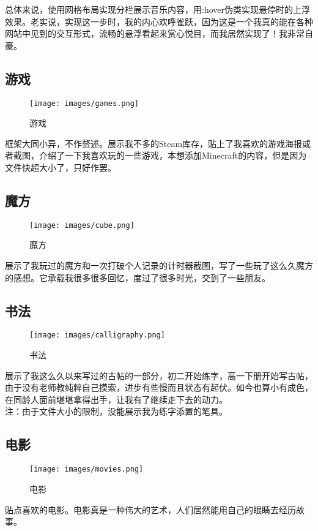 \documentclass[supercite]{Experimental_Report}
\theoremstyle{definition}
\begin{document}
	总体来说，使用网格布局实现分栏展示音乐内容，用:hover伪类实现悬停时的上浮效果。老实说，实现这一步时，我的内心欢呼雀跃，因为这是一个我真的能在各种网站中见到的交互形式，流畅的悬浮看起来赏心悦目，而我居然实现了！我非常自豪。
	
\subsection{游戏}

\begin{figure}[h]
	\begin{center}
		\texttt{[image: images/games.png]}
		\caption{游戏}
		\label{fig3-3}
	\end{center}
\end{figure}
框架大同小异，不作赘述。展示我不多的Steam库存，贴上了我喜欢的游戏海报或者截图，介绍了一下我喜欢玩的一些游戏，本想添加Minecraft的内容，但是因为文件快超大小了，只好作罢。
\subsection{魔方}
\begin{figure}[h]
	\begin{center}
		\texttt{[image: images/cube.png]}
		\caption{魔方}
		\label{fig3-4}
	\end{center}
\end{figure}
展示了我玩过的魔方和一次打破个人记录的计时器截图，写了一些玩了这么久魔方的感想。它承载我很多很多回忆，度过了很多时光，交到了一些朋友。
\newpage
\subsection{书法}
\begin{figure}[h]
	\begin{center}
		\texttt{[image: images/calligraphy.png]}
		\caption{书法}
		\label{fig3-5}
	\end{center}
\end{figure}
展示了我这么久以来写过的古帖的一部分，初二开始练字，高一下册开始写古帖，由于没有老师教纯粹自己摸索，进步有些慢而且状态有起伏。如今也算小有成色，在同龄人面前堪堪拿得出手，让我有了继续走下去的动力。\\注：由于文件大小的限制，没能展示我为练字添置的笔具。
\subsection{电影}

\begin{figure}[h]
	\begin{center}
		\texttt{[image: images/movies.png]}
		\caption{电影}
		\label{fig3-6}
	\end{center}
\end{figure}
贴点喜欢的电影。电影真是一种伟大的艺术，人们居然能用自己的眼睛去经历故事。
\end{document}
